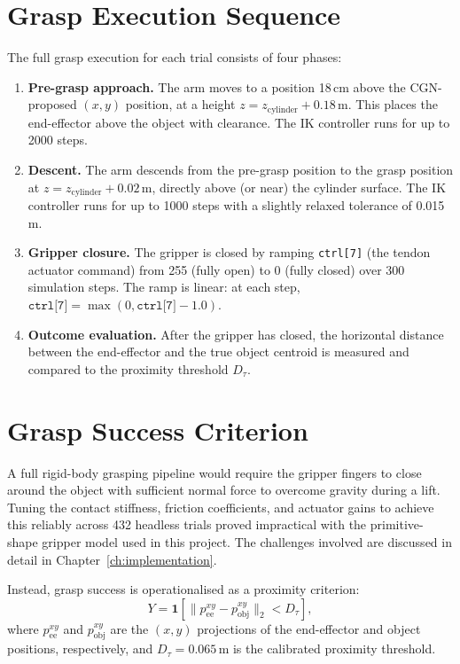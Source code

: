 \documentclass[11pt,a4paper]{report}
\begin{document}
\section{Grasp Execution Sequence}
\label{sec:grasp_execution}

The full grasp execution for each trial consists of four phases:

\begin{enumerate}
  \item \textbf{Pre-grasp approach.} The arm moves to a position 18\,cm above the CGN-proposed $(x, y)$ position, at a height $z = z_{\text{cylinder}} + 0.18$\,m. This places the end-effector above the object with clearance. The IK controller runs for up to 2000 steps.

  \item \textbf{Descent.} The arm descends from the pre-grasp position to the grasp position at $z = z_{\text{cylinder}} + 0.02$\,m, directly above (or near) the cylinder surface. The IK controller runs for up to 1000 steps with a slightly relaxed tolerance of 0.015\,m.

  \item \textbf{Gripper closure.} The gripper is closed by ramping \texttt{ctrl[7]} (the tendon actuator command) from 255 (fully open) to 0 (fully closed) over 300 simulation steps. The ramp is linear: at each step, $\texttt{ctrl[7]} = \max(0, \texttt{ctrl[7]} - 1.0)$.

  \item \textbf{Outcome evaluation.} After the gripper has closed, the horizontal distance between the end-effector and the true object centroid is measured and compared to the proximity threshold $D_\tau$.
\end{enumerate}

\section{Grasp Success Criterion}
\label{sec:success_criterion_detail}

A full rigid-body grasping pipeline would require the gripper fingers to close around the object with sufficient normal force to overcome gravity during a lift. Tuning the contact stiffness, friction coefficients, and actuator gains to achieve this reliably across 432 headless trials proved impractical with the primitive-shape gripper model used in this project. The challenges involved are discussed in detail in Chapter~\ref{ch:implementation}.

Instead, grasp success is operationalised as a proximity criterion:
\begin{equation}
  Y = \mathbf{1}\!\left[
    \|p_{\text{ee}}^{xy} - p_{\text{obj}}^{xy}\|_2 < D_\tau
  \right],
  \label{eq:success}
\end{equation}
where $p_{\text{ee}}^{xy}$ and $p_{\text{obj}}^{xy}$ are the $(x, y)$ projections of the end-effector and object positions, respectively, and $D_\tau = 0.065$\,m is the calibrated proximity threshold.
\end{document}
